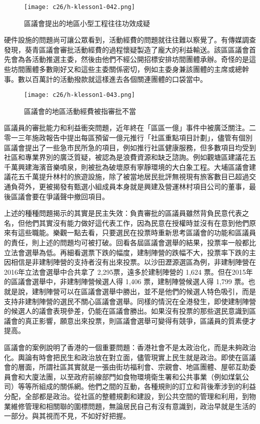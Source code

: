 \begin{figure}[htbp]
    \centering
    \texttt{[image: c26/h-klesson1-042.png]}
    \caption{區議會提出的地區小型工程往往功效成疑} 
\end{figure}

硬件設施的問題尚可讓公眾看到，活動經費的問題就往往難以察覺了。有傳媒調查發現，葵青區議會審批活動經費的過程懷疑製造了龐大的利益輸送。該區區議會首先會為各活動推選主委，然後由他們不經公開招標安排坊間團體承辦。奇怪的是這些坊間團體多數剛好又和這些主委關係密切，例如主委身兼該團體的主席或總幹事。數以百萬計的活動撥款就這樣進去各個關連團體的口袋當中。

\begin{figure}[htbp]
    \centering
    \texttt{[image: c26/h-klesson1-043.png]}
    \caption{區議會的地區活動經費被指審批不當} 
\end{figure}

區議員的審批能力和利益衝突問題，近年終在「區區一億」事件中被廣泛關注。二零一三年施政報告中提出每區預留一億元推行「社區重點項目計劃」，儘管有個別區議會提出了一些急市民所急的項目，例如推行社區健康服務，但多數項目均受到社區和專業界別的廣泛質疑，被認為是浪費資源和缺乏諮詢。例如觀塘區建議花五千萬興建海濱音樂噴泉，則被批為破壞原有寧靜環境的大白象工程。大埔區議會建議花五千萬提升林村的旅遊設施，除了被當地居民批評無視現有旅客數目已超過交通負荷外，更被揭發有甄選小組成員本身就是興建及營運林村項目公司的董事，最後區議會要在爭議聲中撤回項目。

上述的種種問題揭示的其實是民主失效：負責審批的區議員雖然背負民意代表之名，但他們其實沒有能力做好這代表工作，因為民意在授權時並沒有在意到他們原來有這些職能。樂觀一點去看，只要選民在投票時重新思考區議會的功能和區議員的責任，則上述的問題均可被打破。回看各屆區議會選舉的結果，投票率一般都比立法會選舉為低。再細看選票下跌的幅度，建制陣營的跌幅不大，投票率下跌的主因相信是非建制陣營的支持者沒有出來投票。以沙田瀝源選區為例，非建制陣營在2016年立法會選舉中合共拿了 2,295票，遠多於建制陣營的 1,624 票。但在2015年的區議會選舉中，非建制陣營候選人得 1,406 票，建制陣營候選人得 1,799 票。也就是說，建制陣營可以在區議會選舉中勝出，並不是他們的候選人特色吸引，而是支持非建制陣營的選民不關心區議會選舉。同樣的情況在全港發生，即使建制陣營的候選人的議會表現參差，仍能在區議會勝出。如果沒有投票的那些選民意識到區議會的真正影響，願意出來投票，則區議會選舉可變得有競爭，區議員的質素便才提高。

區議會的案例說明了香港的一個重要問題：香港社會不是太政治化，而是未夠政治化。輿論有時會把民生和政治放在對立面，儘管現實上民生就是政治。即使在區議會的層面，所謂社區其實就是一張由街坊福利會、宗親會、地區團體、屋邨互助委員會和大廈法團，以至政府前線部門如食物環境衛生署和公共事業（例如煤氣公司）等等所組成的關係網。他們之間的互動，各種規則的訂立和背後牽涉到的利益分配，全部都是政治。從社區的整體規劃和建設，到公共空間的管理和利用，到物業維修管理和相關聯的圍標問題，無論居民自己有沒有意識到，政治早就是生活的一部分。與其視而不見，不如好好把握。

